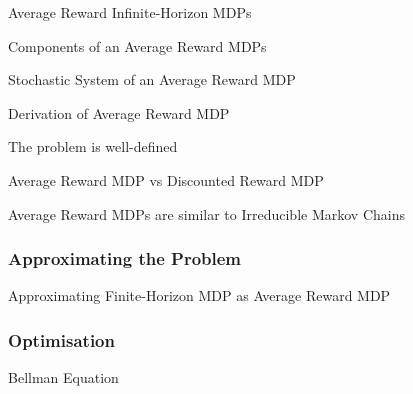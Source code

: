 \documentclass[11pt,a4paper]{article}
\begin{document}
  \begin{definition}{Average Reward Infinite-Horizon MDPs}

  \end{definition}

  \begin{proposition}{Components of an Average Reward MDPs}
  \end{proposition}

  \begin{proposition}{Stochastic System of an Average Reward MDP}

  \end{proposition}

  \begin{remark}{Derivation of Average Reward MDP}

  \end{remark}

  \begin{remark}{The problem is well-defined}
  \end{remark}

  \begin{remark}{Average Reward MDP vs Discounted Reward MDP}

  \end{remark}

  \begin{remark}{Average Reward MDPs are similar to Irreducible Markov Chains}

  \end{remark}

\subsubsection{Approximating the Problem} %

  \begin{proposition}{Approximating Finite-Horizon MDP as Average Reward MDP}

  \end{proposition}

\subsubsection{Optimisation} %

  \begin{definition}{Bellman Equation}

  \end{definition}
\end{document}
